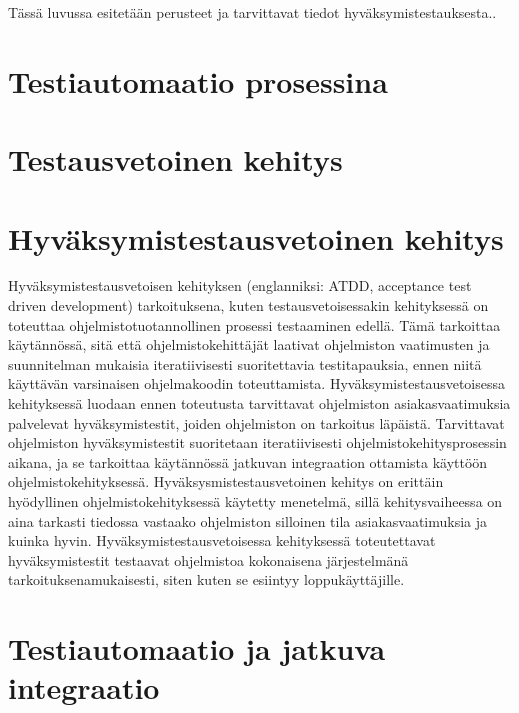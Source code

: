Tässä luvussa esitetään perusteet ja tarvittavat tiedot hyväksymistestauksesta..

\section{Testiautomaatio prosessina}


\section{Testausvetoinen kehitys}


\section{Hyväksymistestausvetoinen kehitys}

Hyväksymistestausvetoisen kehityksen (englanniksi: ATDD, acceptance test driven development) tarkoituksena, kuten testausvetoisessakin kehityksessä on toteuttaa ohjelmistotuotannollinen prosessi testaaminen edellä.
Tämä tarkoittaa käytännössä, sitä että ohjelmistokehittäjät laativat ohjelmiston vaatimusten ja suunnitelman mukaisia iteratiivisesti suoritettavia testitapauksia, ennen niitä käyttävän varsinaisen ohjelmakoodin toteuttamista.
Hyväksymistestausvetoisessa kehityksessä luodaan ennen toteutusta tarvittavat ohjelmiston asiakasvaatimuksia palvelevat hyväksymistestit, joiden ohjelmiston on tarkoitus läpäistä.
Tarvittavat ohjelmiston hyväksymistestit suoritetaan iteratiivisesti ohjelmistokehitysprosessin aikana, ja se tarkoittaa käytännössä jatkuvan integraation ottamista käyttöön ohjelmistokehityksessä.
Hyväksysmistestausvetoinen kehitys on erittäin hyödyllinen ohjelmistokehityksessä käytetty menetelmä, sillä kehitysvaiheessa on aina tarkasti tiedossa vastaako ohjelmiston silloinen tila asiakasvaatimuksia ja kuinka hyvin.
Hyväksymistestausvetoisessa kehityksessä toteutettavat hyväksymistestit testaavat ohjelmistoa kokonaisena järjestelmänä tarkoituksenamukaisesti, siten kuten se esiintyy loppukäyttäjille.

\section{Testiautomaatio ja jatkuva integraatio}

